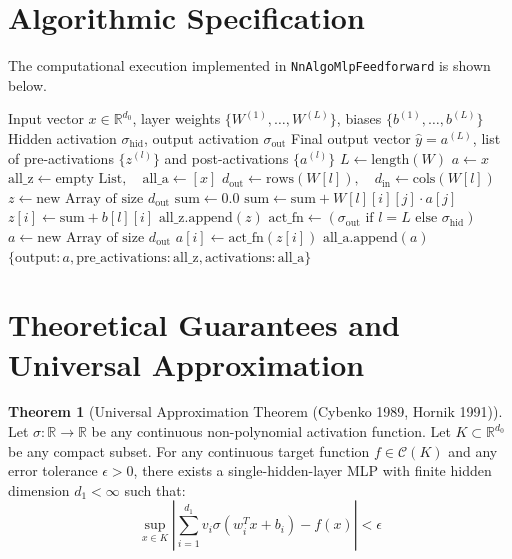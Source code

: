 \documentclass[11pt,a4paper]{article}
\theoremstyle{definition}
\newtheorem{theorem}{Theorem}[section]
\begin{document}
\section{Algorithmic Specification}

The computational execution implemented in \texttt{NnAlgoMlpFeedforward} is shown below.

\begin{algorithm}[H]
\caption{Multilayer Perceptron Forward Propagation}
\begin{algorithmic}[1]
\Require Input vector $x \in \mathbb{R}^{d_0}$, layer weights $\{W^{(1)}, \dots, W^{(L)}\}$, biases $\{b^{(1)}, \dots, b^{(L)}\}$
\Require Hidden activation $\sigma_{\text{hid}}$, output activation $\sigma_{\text{out}}$
\Ensure Final output vector $\hat{y} = a^{(L)}$, list of pre-activations $\{z^{(l)}\}$ and post-activations $\{a^{(l)}\}$
\State $L \gets \text{length}(W)$
\State $a \gets x$
\State $\text{all\_z} \gets \text{empty List}, \quad \text{all\_a} \gets [x]$
    \State $d_{\text{out}} \gets \text{rows}(W[l]), \quad d_{\text{in}} \gets \text{cols}(W[l])$
    \State $z \gets \text{new Array of size } d_{\text{out}}$
        \State $\text{sum} \gets 0.0$
            \State $\text{sum} \gets \text{sum} + W[l][i][j] \cdot a[j]$
        \EndFor
        \State $z[i] \gets \text{sum} + b[l][i]$
    \EndFor
    \State $\text{all\_z}.\text{append}(z)$
    \State $\text{act\_fn} \gets (\sigma_{\text{out}} \text{ if } l = L \text{ else } \sigma_{\text{hid}})$
    \State $a \gets \text{new Array of size } d_{\text{out}}$
        \State $a[i] \gets \text{act\_fn}(z[i])$
    \EndFor
    \State $\text{all\_a}.\text{append}(a)$
\EndFor
\State \Return $\{\text{output}: a, \text{pre\_activations}: \text{all\_z}, \text{activations}: \text{all\_a}\}$
\end{algorithmic}
\end{algorithm}

\section{Theoretical Guarantees and Universal Approximation}

\begin{theorem}[Universal Approximation Theorem (Cybenko 1989, Hornik 1991)]
Let $\sigma: \mathbb{R} \to \mathbb{R}$ be any continuous non-polynomial activation function. Let $K \subset \mathbb{R}^{d_0}$ be any compact subset. For any continuous target function $f \in \mathcal{C}(K)$ and any error tolerance $\epsilon > 0$, there exists a single-hidden-layer MLP with finite hidden dimension $d_1 < \infty$ such that:
\begin{equation}
\sup_{x \in K} \left| \sum_{i=1}^{d_1} v_i \sigma(w_i^T x + b_i) - f(x) \right| < \epsilon
\end{equation}
\end{theorem}
\end{document}
